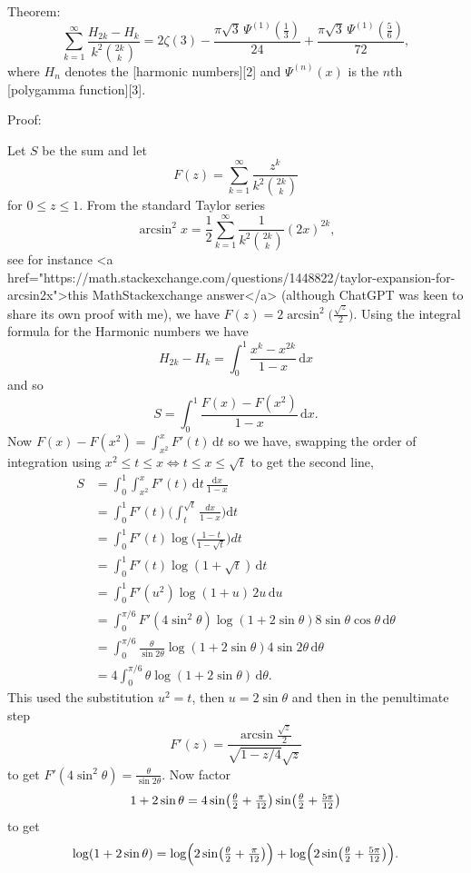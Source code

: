 Theorem:
$$\sum_{k=1}^\infty\frac{H_{2k}-H_{k}}{k^2\binom{2k}k}=2 \zeta(3)-\frac{\pi  \sqrt{3}\, \Psi^{\left(1\right)}\! \left(\frac{1}{3}\right)}{24}+\frac{\pi  \sqrt{3}\, \Psi^{\left(1\right)}\! \left(\frac{5}{6}\right)}{72}\tag{1},$$
where $H_n$ denotes the [harmonic numbers][2] and $\Psi^{(n)}(x)$ is the $n$th [polygamma function][3].


Proof:
$\newcommand{\mfrac}[2]{{\textstyle\frac{#1}{#2}}}$

Let $S$ be the sum and let 
$$
F(z)=\sum_{k=1}^\infty \frac{z^k}{k^2\binom{2k}{k}} $$
for $0 \le z \le 1$. From the standard Taylor series
$$\arcsin^2 x = \frac{1}{2} \sum_{k=1}^\infty \frac{1}{k^2 \binom{2k}{k}} (2x)^{2k},$$
see for instance <a href="https://math.stackexchange.com/questions/1448822/taylor-expansion-for-arcsin2x">this MathStackexchange answer</a> (although ChatGPT was keen to share its own proof with me), we have $F(z)=2\arcsin^2\bigl(\frac{\sqrt z}{2}\bigr)$.
Using the integral formula for the Harmonic numbers we have
$$ H_{2k}-H_k
= \int_0^1 \frac{x^k-x^{2k}}{1-x}\,\mathrm{d}x $$
and so
$$ S =\int_0^1 \frac{F(x)-F(x^2)}{1-x}\,\mathrm{d}x. $$
Now
$F(x)-F(x^2)=\int_{x^2}^x F'(t)\,\mathrm{d}t $
so we have, swapping the order of integration using
$x^2 \le t \le x \iff t \le x \le \sqrt{t}$ to get the second line,
$$  \begin{aligned} S &= \int_0^1 \int_{x^2}^x F'(t)\, \mathrm{d}t\, \frac{\mathrm{d}x}{1-x} \\ &=
\int_0^1 F'(t)\bigl(\int_t^{\sqrt t}\frac{dx}{1-x}\bigr)\mathrm{d}t \\ &=
\int_0^1 F'(t)\log \bigl(\frac{1-t}{1-\sqrt t}\bigr)dt \\ 
&= \int_0^1 F'(t)\log(1+\sqrt t)\,\mathrm{d}t \\
&= \int_0^1 F'(u^2) \log (1+u)\, 2u\, \mathrm{d}u \\
&= \int_0^{\pi/6} F'(4\sin^2\theta) \log(1 + 2\sin \theta) 8\sin\theta \cos \theta \,\mathrm{d}\theta \\
&= \int_0^{\pi/6} \frac{\theta}{\sin 2 \theta} \log (1 + 2 \sin \theta) 4 \sin 2\theta  \,\mathrm{d}\theta \\ 
&= 4\int_0^{\pi/6} \theta \log (1 + 2 \sin \theta) \,\mathrm{d}\theta.
 \end{aligned}$$
This used the substitution $u^2 = t$, then $u = 2\sin \theta$ and 
then in the penultimate step 
$$ F'(z) = \frac{\arcsin \frac{\sqrt{z}}{2} }{\sqrt{1-z/4} \sqrt{z}} $$
to get $F'(4\sin^2 \theta) = \frac{\theta}{\sin 2\theta}$.
 Now factor
$$
1+2\sin\theta =
4\sin\!\left(\mfrac{\theta}{2}+\mfrac{\pi}{12}\right)
 \sin\!\left(\mfrac{\theta}{2}+\mfrac{5\pi}{12}\right) $$
to get
$$
\log(1+2\sin\theta) =
\log \Bigr(2\sin\bigl(\mfrac{\theta}{2}+\mfrac{\pi}{12}\bigr)\Bigr) +
\log \Bigr(2\sin\bigl(\mfrac{\theta}{2}+\mfrac{5\pi}{12}\bigr)\Bigr). $$

